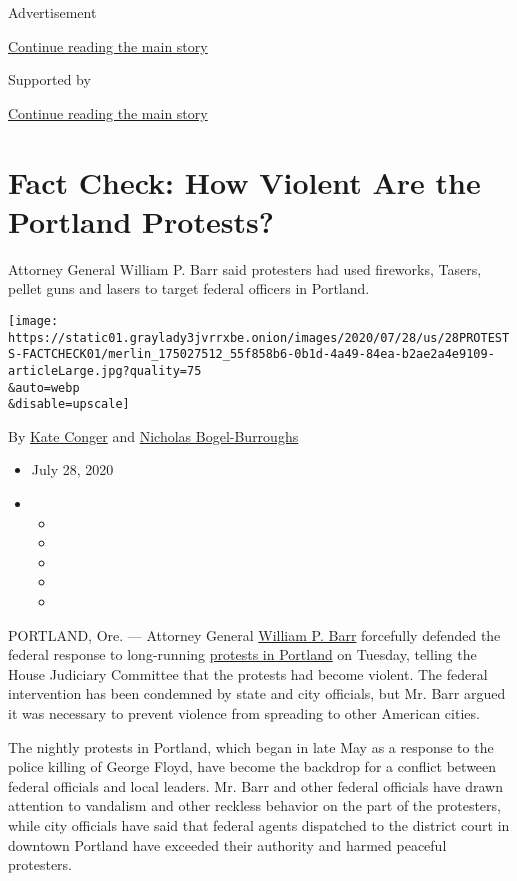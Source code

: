 Advertisement

\protect\hyperlink{after-top}{Continue reading the main story}

Supported by

\protect\hyperlink{after-sponsor}{Continue reading the main story}

\hypertarget{fact-check-how-violent-are-the-portland-protests}{%
\section{Fact Check: How Violent Are the Portland
Protests?}\label{fact-check-how-violent-are-the-portland-protests}}

Attorney General William P. Barr said protesters had used fireworks,
Tasers, pellet guns and lasers to target federal officers in Portland.

\texttt{[image: https://static01.graylady3jvrrxbe.onion/images/2020/07/28/us/28PROTESTS-FACTCHECK01/merlin\_175027512\_55f858b6-0b1d-4a49-84ea-b2ae2a4e9109-articleLarge.jpg?quality=75\\\&auto=webp\\\&disable=upscale]}

By \href{https://www.nytimes3xbfgragh.onion/by/kate-conger}{Kate Conger}
and
\href{https://www.nytimes3xbfgragh.onion/by/nicholas-bogel-burroughs}{Nicholas
Bogel-Burroughs}

\begin{itemize}
\item
  July 28, 2020
\item
  \begin{itemize}
  \item
  \item
  \item
  \item
  \item
  \end{itemize}
\end{itemize}

PORTLAND, Ore. --- Attorney General
\href{https://www.nytimes3xbfgragh.onion/2020/07/28/us/politics/barr-testimony.html}{William
P. Barr} forcefully defended the federal response to long-running
\href{https://www.nytimes3xbfgragh.onion/2020/07/29/us/protests-portland-federal-withdrawal.html}{protests
in Portland} on Tuesday, telling the House Judiciary Committee that the
protests had become violent. The federal intervention has been condemned
by state and city officials, but Mr. Barr argued it was necessary to
prevent violence from spreading to other American cities.

The nightly protests in Portland, which began in late May as a response
to the police killing of George Floyd, have become the backdrop for a
conflict between federal officials and local leaders. Mr. Barr and other
federal officials have drawn attention to vandalism and other reckless
behavior on the part of the protesters, while city officials have said
that federal agents dispatched to the district court in downtown
Portland have exceeded their authority and harmed peaceful protesters.

